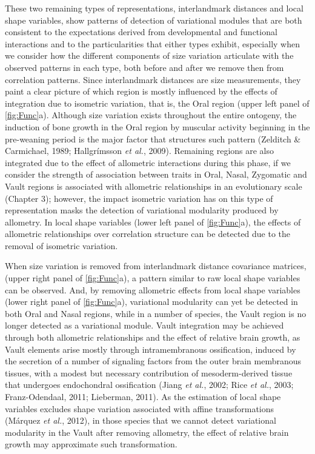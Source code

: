 \documentclass[12pt,]{article}
\begin{document}
These two remaining types of representations, interlandmark distances
and local shape variables, show patterns of detection of variational
modules that are both consistent to the expectations derived from
developmental and functional interactions and to the particularities
that either types exhibit, especially when we consider how the different
components of size variation articulate with the observed patterns in
each type, both before and after we remove then from correlation
patterns. Since interlandmark distances are size measurements, they
paint a clear picture of which region is mostly influenced by the
effects of integration due to isometric variation, that is, the Oral
region (upper left panel of \autoref{fig:Func}a). Although size
variation exists throughout the entire ontogeny, the induction of bone
growth in the Oral region by muscular activity beginning in the
pre-weaning period is the major factor that structures such pattern
(Zelditch \& Carmichael, 1989; Hallgrímsson \emph{et al.}, 2009).
Remaining regions are also integrated due to the effect of allometric
interactions during this phase, if we consider the strength of
association between traits in Oral, Nasal, Zygomatic and Vault regions
is associated with allometric relationships in an evolutionary scale
(Chapter 3); however, the impact isometric variation has on this type of
representation masks the detection of variational modularity produced by
allometry. In local shape variables (lower left panel of
\autoref{fig:Func}a), the effects of allometric relationships over
correlation structure can be detected due to the removal of isometric
variation.

When size variation is removed from interlandmark distance covariance
matrices, (upper right panel of \autoref{fig:Func}a), a pattern similar
to raw local shape variables can be observed. And, by removing
allometric effects from local shape variables (lower right panel of
\autoref{fig:Func}a), variational modularity can yet be detected in both
Oral and Nasal regions, while in a number of species, the Vault region
is no longer detected as a variational module. Vault integration may be
achieved through both allometric relationships and the effect of
relative brain growth, as Vault elements arise mostly through
intramembranous ossification, induced by the secretion of a number of
signaling factors from the outer brain membranous tissues, with a modest
but necessary contribution of mesoderm-derived tissue that undergoes
endochondral ossification (Jiang \emph{et al.}, 2002; Rice \emph{et
al.}, 2003; Franz-Odendaal, 2011; Lieberman, 2011). As the estimation of
local shape variables excludes shape variation associated with affine
transformations (Márquez \emph{et al.}, 2012), in those species that we
cannot detect variational modularity in the Vault after removing
allometry, the effect of relative brain growth may approximate such
transformation.
\end{document}
